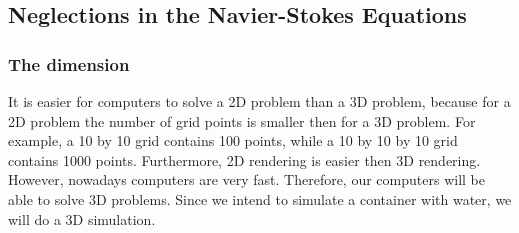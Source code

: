 \documentclass{article}
\begin{document}
\subsection{Neglections in the Navier-Stokes Equations}
\subsubsection{The dimension}
It is easier for computers to solve a 2D problem than a 3D problem, because for a 2D problem the number of grid points is smaller then for a 3D problem. For example, a 10 by 10 grid contains 100 points, while a 10 by 10 by 10 grid contains 1000 points. Furthermore, 2D rendering is easier then 3D rendering. However, nowadays computers are very fast. Therefore, our computers will be able to solve 3D problems. Since we intend to simulate a container with water, we will do a 3D simulation.
\end{document}
